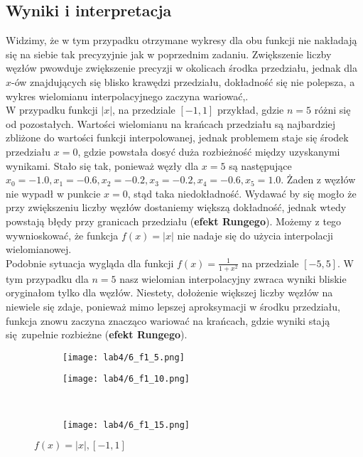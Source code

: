 \documentclass[a4paper]{article}
\begin{document}
    \subsection{Wyniki i interpretacja}
    Widzimy, że w tym przypadku otrzymane wykresy dla obu funkcji nie nakładają się na siebie tak precyzyjnie jak w poprzednim zadaniu. Zwiększenie liczby węzłów pwowduje zwiększenie precyzji w okolicach środka przedziału, jednak dla $x$-ów znajdujących się blisko krawędzi przedziału, dokładność się nie polepsza, a wykres wielomianu interpolacyjnego zaczyna wariować,.\\
    W przypadku funkcji $|x|$, na przedziale $[-1, 1]$ przykład, gdzie $n=5$ różni się od pozostałych. Wartości wielomianu na krańcach przedziału są najbardziej zbliżone do wartości funkcji interpolowanej, jednak problemem staje się środek przedziału $x=0$, gdzie powstała dosyć duża rozbieżność między uzyskanymi wynikami. Stało się tak, ponieważ węzły dla $x=5$ są następujące $x_0 = -1.0, x_1 = -0.6, x_2 = -0.2, x_3 = -0.2, x_4 = -0.6, x_5 = 1.0$. Żaden z węzłów nie wypadł w punkcie $x = 0$, stąd taka niedokładność. Wydawać by się mogło że przy zwiększeniu liczby węzłów dostaniemy większą dokładność, jednak wtedy powstają błędy przy granicach przedziału (\textbf{efekt Rungego}). Możemy z tego wywnioskować, że funkcja $f(x) = |x|$ nie nadaje się do użycia interpolacji wielomianowej. \\
    Podobnie sytuacja wygląda dla funkcji $f(x) = \frac{1}{1+x^2}$ na przedziale $[-5, 5]$. W tym przypadku dla $n=5$ nasz wielomian interpolacyjny zwraca wyniki bliskie oryginałom tylko dla węzłów. Niestety, dołożenie większej liczby węzłów na niewiele się zdaje, ponieważ mimo lepszej aproksymacji w środku przedziału, funkcja znowu zaczyna znacząco wariować na krańcach, gdzie wyniki stają się zupełnie rozbieżne (\textbf{efekt Rungego}).
    

    \begin{figure}[H]
     \centering
     \begin{subfigure}[b]{0.5\textwidth}
         \centering
         \texttt{[image: lab4/6\_f1\_5.png]}
     \end{subfigure}
     \hfill
     \begin{subfigure}[b]{0.5\textwidth}
         \centering
         \texttt{[image: lab4/6\_f1\_10.png]}
     \end{subfigure}
     \hfill
     \\
     \begin{subfigure}[b]{0.5\textwidth}
         \centering
         \texttt{[image: lab4/6\_f1\_15.png]}
     \end{subfigure}
        \caption{$f(x) = |x|, [-1, 1]$}
    \end{figure}
    
\end{document}
